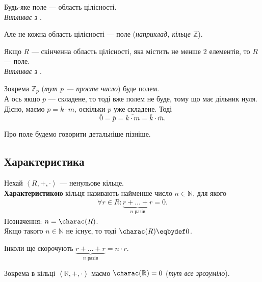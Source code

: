 \documentclass{math_library}
\begin{document}
\begin{corollary}
Будь-яке поле --- область цілісності.\\
\textit{Випливає з} .
\end{corollary}

\begin{remark}
Але не кожна область цілісності --- поле (\textit{наприклад, кільце $\mathbb{Z}$}).
\end{remark}

\begin{theorem}
Якщо $R$ --- скінченна область цілісності, яка містить не менше $2$ елементів, то $R$ --- поле.\\
\textit{Випливає з} .
\end{theorem}

\begin{example}
Зокрема $\mathbb{Z}_p$ (\textit{тут $p$ --- просте число}) буде полем.
\bigskip \\
А ось якщо $p$ --- складене, то тоді вже полем не буде, тому що має дільник нуля. Дісно, маємо $p = k \cdot m$, оскільки $p$ уже складене. Тоді 
\[
\overline{0} = \overline{p} = \overline{k \cdot m} = \overline{k} \cdot \overline{m}.
\]
\end{example}
\noindent
Про поле будемо говорити детальніше пізніше.


\subsection{Характеристика}
\begin{definition}
Нехай $\left< R, +, \cdot \right>$ --- ненульове кільце.\\
\textbf{Характеристикою} кільця називають найменше число $n \in \mathbb{N}$, для якого
\begin{align*}
\forall r \in R: \underbrace{r+\dots+r}_{n\text{ разів}} = 0.
\end{align*}
Позначення: $n = \charac(R)$.\\
Якщо такого $n \in \mathbb{N}$ не існує, то тоді $\charac(R) \eqbydef 0$.
\end{definition}

\begin{remark}
Інколи ще скорочують $\underbrace{r+\dots+r}_{n\text{ разів}} = n \cdot r$.
\end{remark}

\begin{example}
Зокрема в кільці $\left< \mathbb{R},+,\cdot \right>$ маємо $\charac(\mathbb{R}) = 0$ (\textit{тут все зрозуміло}).
\end{example}
\end{document}
